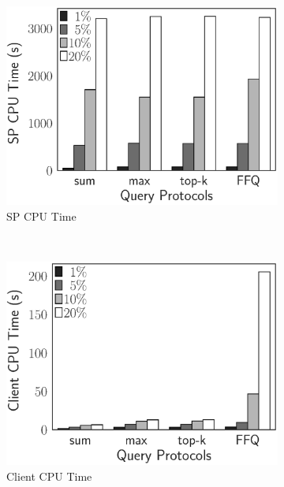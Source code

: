 \begin{figure}[t]
  \centering
  \begin{subfigure}[b]{.31\linewidth}
    \centering
    \includegraphics[width=\linewidth]{exp-figs/aggregate-queries/tpch_sp.eps}
    \caption{SP CPU Time}
  \end{subfigure}~%
  \begin{subfigure}[b]{.31\linewidth}
    \centering
    \includegraphics[width=\linewidth]{exp-figs/aggregate-queries/tpch_client.eps}
    \caption{Client CPU Time}
  \end{subfigure}~%
  \begin{subfigure}[b]{.36\linewidth}
    \centering

\end{subfigure}
\end{figure}
